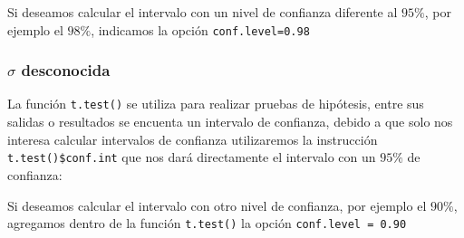 \documentclass[
]{krantz}
\makeatletter
\newenvironment{Shaded}{\begin{snugshade}}{\end{snugshade}}
\newcommand{\CommentTok}[1]{\textcolor[rgb]{0.37,0.37,0.37}{\textit{#1}}}
\newcommand{\DataTypeTok}[1]{\textcolor[rgb]{0.27,0.27,0.27}{#1}}
\newcommand{\FloatTok}[1]{\textcolor[rgb]{0.06,0.06,0.06}{#1}}
\newcommand{\KeywordTok}[1]{\textcolor[rgb]{0.27,0.27,0.27}{\textbf{#1}}}
\newcommand{\NormalTok}[1]{#1}
\newcommand{\OperatorTok}[1]{\textcolor[rgb]{0.43,0.43,0.43}{\textbf{#1}}}
\newenvironment{kframe}{%
\medskip{}
\setlength{\fboxsep}{.8em}
 \def\at@end@of@kframe{}%
 \ifinner\ifhmode%
  \def\at@end@of@kframe{\end{minipage}}%
  \begin{minipage}{\columnwidth}%
 \fi\fi%
 \def\FrameCommand##1{\hskip\@totalleftmargin \hskip-\fboxsep
 \colorbox{shadecolor}{##1}\hskip-\fboxsep
     \hskip-\linewidth \hskip-\@totalleftmargin \hskip\columnwidth}%
 \MakeFramed {\advance\hsize-\width
   \@totalleftmargin\z@ \linewidth\hsize
   \@setminipage}}%
 {\par\unskip\endMakeFramed%
 \at@end@of@kframe}
\renewenvironment{Shaded}{\begin{kframe}}{\end{kframe}}
\makeatother
\begin{document}
\begin{Shaded}
\end{Shaded}

Si deseamos calcular el intervalo con un nivel de confianza diferente al \(95\%\), por ejemplo el \(98\%\), indicamos la opción \texttt{conf.level=0.98}

\begin{Shaded}
\end{Shaded}

\hypertarget{musd}{%
\subsubsection{\texorpdfstring{\(\sigma\) desconocida}{\textbackslash{}sigma desconocida}}\label{musd}}

La función \texttt{t.test()} se utiliza para realizar pruebas de hipótesis, entre sus salidas o resultados se encuenta un intervalo de confianza, debido a que solo nos interesa calcular intervalos de confianza utilizaremos la instrucción \texttt{t.test()\$conf.int} que nos dará directamente el intervalo con un \(95\%\) de confianza:

\begin{Shaded}
\end{Shaded}

Si deseamos calcular el intervalo con otro nivel de confianza, por ejemplo el \(90\%\), agregamos dentro de la función \texttt{t.test()} la opción \texttt{conf.level\ =\ 0.90}
\end{document}
